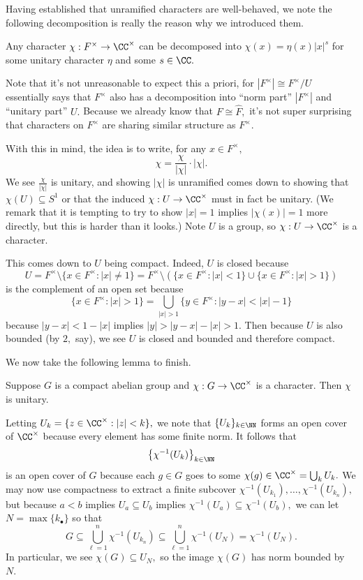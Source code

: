Having established that unramified characters are well-behaved, we note the following decomposition is really the reason why we introduced them.
\begin{proposition}
    Any character $\chi:F^\times\to\CC^\times$ can be decomposed into $\chi(x)=\eta(x)|x|^s$ for some unitary character $\eta$ and some $s\in\CC.$
\end{proposition}
Note that it's not unreasonable to expect this a priori, for $|F^\times|\cong F^\times/U$ essentially says that $F^\times$ also has a decomposition into ``norm part'' $|F^\times|$ and ``unitary part'' $U.$ Because we already know that $F\cong\widehat F,$ it's not super surprising that characters on $F^\times$ are sharing similar structure as $F^\times.$

With this in mind, the idea is to write, for any $x\in F^\times,$
\[\chi=\frac\chi{|\chi|}\cdot|\chi|.\]
We see $\frac\chi{|\chi|}$ is unitary, and showing $|\chi|$ is unramified comes down to showing that $\chi(U)\subseteq S^1$ or that the induced $\chi:U\to\CC^\times$ must in fact be unitary. (We remark that it is tempting to try to show $|x|=1$ implies $|\chi(x)|=1$ more directly, but this is harder than it looks.) Note $U$ is a group, so $\chi:U\to\CC^\times$ is a character.

This comes down to $U$ being compact. Indeed, $U$ is closed because
\[U=F^\times\setminus\{x\in F^\times:|x|\ne1\}=F^\times\setminus\left(\{x\in F^\times:|x|<1\}\cup\{x\in F^\times:|x|>1\}\right)\]
is the complement of an open set because
\[\{x\in F^\times:|x|>1\}=\bigcup_{|x|>1}\{y\in F^\times:|y-x|<|x|-1\}\]
because $|y-x|<1-|x|$ implies $|y|>|y-x|-|x|>1.$ Then because $U$ is also bounded (by $2,$ say), we see $U$ is closed and bounded and therefore compact.

We now take the following lemma to finish.
\begin{lemma}
    Suppose $G$ is a compact abelian group and $\chi:G\to\CC^\times$ is a character. Then $\chi$ is unitary.
\end{lemma}
Letting $U_k=\{z\in\CC^\times:|z|<k\},$ we note that $\{U_k\}_{k\in\NN}$ forms an open cover of $\CC^\times$ because every element has some finite norm. It follows that
\[\left\{\chi^{-1}(U_k)\right\}_{k\in\NN}\]
is an open cover of $G$ because each $g\in G$ goes to some $\chi(g)\in\CC^\times=\bigcup_kU_k.$ We may now use compactness to extract a finite subcover $\chi^{-1}(U_{k_1}),\ldots,\chi^{-1}(U_{k_n}),$ but because $a<b$ implies $U_a\subseteq U_b$ implies $\chi^{-1}(U_a)\subseteq\chi^{-1}(U_b),$ we can let $N=\max\{k_\bullet\}$ so that
\[G\subseteq\bigcup_{\ell=1}^n\chi^{-1}(U_{k_n})\subseteq\bigcup_{\ell=1}^n\chi^{-1}(U_N)=\chi^{-1}(U_N).\]
In particular, we see $\chi(G)\subseteq U_N,$ so the image $\chi(G)$ has norm bounded by $N.$

